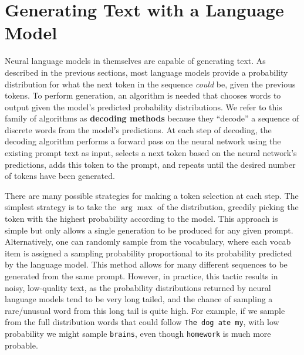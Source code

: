 \section{Generating Text with a Language Model}
\label{section:background_gen}

Neural language models in themselves are capable of generating text.
As described in the previous sections, most language models provide a probability distribution for what the next token in the sequence \textit{could} be, given the previous tokens.
To perform generation, an algorithm is needed that chooses words to output given the model's predicted probability distributions.
We refer to this family of algorithms as \textbf{decoding methods} because they ``decode'' a sequence of discrete words from the model's predictions.
At each step of decoding, the decoding algorithm performs a forward pass on the neural network using the existing prompt text as input, selects a next token based on the neural network's predictions, adds this token to the prompt, and repeats until the desired number of tokens have been generated.

There are many possible strategies for making a token selection at each step.
The simplest strategy is to take the $\arg \max$ of the distribution, greedily picking the token with the highest probability according to the model.
This approach is simple but only allows a single generation to be produced for any given prompt.
Alternatively, one can randomly sample from the vocabulary, where each vocab item is assigned a sampling probability proportional to its probability predicted by the language model.
This method allows for many different sequences to be generated from the same prompt.
However, in practice, this tactic results in noisy, low-quality text, as the probability distributions returned by neural language models tend to be very long tailed, and the chance of sampling a rare/unusual word from this long tail is quite high. For example, if we sample from the full distribution words that could follow \texttt{The dog ate my}, with low probability we might sample \texttt{brains}, even though \texttt{homework} is much more probable.

